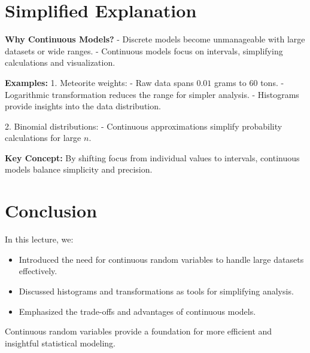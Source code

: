 \documentclass{article}
\begin{document}
\section*{Simplified Explanation}

\textbf{Why Continuous Models?}
- Discrete models become unmanageable with large datasets or wide ranges.
- Continuous models focus on intervals, simplifying calculations and visualization.

\textbf{Examples:}
1. Meteorite weights:
- Raw data spans $0.01$ grams to $60$ tons.
- Logarithmic transformation reduces the range for simpler analysis.
- Histograms provide insights into the data distribution.

2. Binomial distributions:
- Continuous approximations simplify probability calculations for large $n$.

\textbf{Key Concept:}
By shifting focus from individual values to intervals, continuous models balance simplicity and precision.

\section*{Conclusion}

In this lecture, we:
\begin{itemize}
  \item Introduced the need for continuous random variables to handle large datasets effectively.
  \item Discussed histograms and transformations as tools for simplifying analysis.
  \item Emphasized the trade-offs and advantages of continuous models.
\end{itemize}

Continuous random variables provide a foundation for more efficient and insightful statistical modeling.
\end{document}
